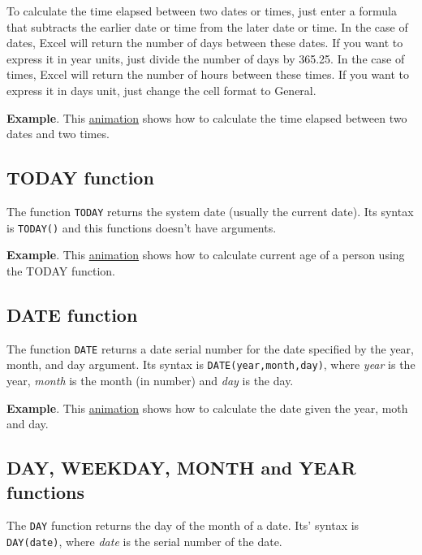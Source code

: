 To calculate the time elapsed between two dates or times, just enter a formula that subtracts the earlier date or time from the later date or time.
In the case of dates, Excel will return the number of days between these dates. If you want to express it in year units, just divide the number of days by 365.25. In the case of times, Excel will return the number of hours between these times. If you want to express it in days unit, just change the cell format to General.

\textbf{Example}. This \href{http://aprendeconalf.es/office/excel/manual/img/example_time_elapsed.gif}{animation} shows how to calculate the time elapsed between two dates and two times.

\subsection{TODAY function}\hypertarget{today-function}{}\label{today-function}

The function \texttt{TODAY} returns the system date (usually the current date). Its syntax is \texttt{TODAY()} and this functions doesn't have arguments.

\textbf{Example}. This \href{http://aprendeconalf.es/office/excel/manual/img/example_function_today.gif}{animation} shows how to calculate current age of a person using the TODAY function.

\subsection{DATE function}\hypertarget{date-function}{}\label{date-function}

The function \texttt{DATE} returns a date serial number for the date specified by the year, month, and day argument. Its syntax is \texttt{DATE(year,month,day)}, where \emph{year} is the year, \emph{month} is the month (in number) and \emph{day} is the day.

\textbf{Example}. This \href{http://aprendeconalf.es/office/excel/manual/img/example_function_date.gif}{animation} shows how to calculate the date given the year, moth and day.

\subsection{DAY, WEEKDAY, MONTH and YEAR functions}\hypertarget{day-weekday-month-and-year-functions}{}\label{day-weekday-month-and-year-functions}

The \texttt{DAY} function returns the day of the month of a date. Its' syntax is \texttt{DAY(date)}, where \emph{date} is the serial number of the date.

